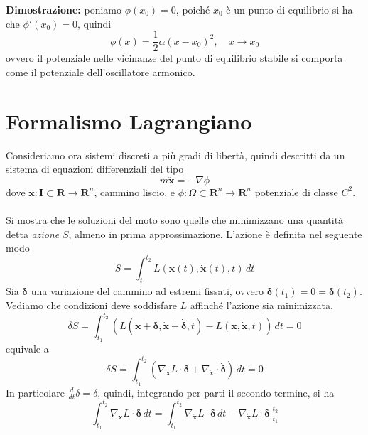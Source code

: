 \documentclass{article}
\begin{document}
\textbf{Dimostrazione:} poniamo $\phi(x_0) = 0$, poiché $x_0$ è un punto di equilibrio si ha che $\phi'(x_0) = 0$, quindi
\begin{equation}
    \phi(x) = \frac{1}{2}\alpha(x - x_0)^2, \quad x \longrightarrow x_0 \tag{2.5}
\end{equation}
ovvero il potenziale nelle vicinanze del punto di equilibrio stabile si comporta come il potenziale dell'oscillatore armonico.

\newpage
\section{Formalismo Lagrangiano}
Consideriamo ora sistemi discreti a più gradi di libertà, quindi descritti da un sistema di equazioni differenziali del tipo
\begin{equation}
    m\ddot{\mathbf{x}} = - \nabla \phi \tag{3.1}
\end{equation}
dove $\mathbf{x} : \mathbf{I} \subset \mathbf{R} \longrightarrow \mathbf{R}^n$, cammino liscio, e $\phi : \Omega \subset \mathbf{R}^n \longrightarrow \mathbf{R}^n$ potenziale di classe $C^2$. \\ \\
Si mostra che le soluzioni del moto sono quelle che minimizzano una quantità detta \textit{azione} $S$, almeno in prima approssimazione. L'azione è definita nel seguente modo
\begin{equation}
    S = \int_{t_1}^{t_2} L(\mathbf{x}(t), \dot{\mathbf{x}}(t), t) \, dt \tag{3.2}
\end{equation}
Sia $\boldsymbol{\delta}$ una variazione del cammino ad estremi fissati, ovvero $\boldsymbol{\delta}(t_1) = 0 = \boldsymbol{\delta}(t_2)$. Vediamo che condizioni deve soddisfare $L$ affinché l'azione sia minimizzata.
\begin{equation}
    \delta S = \int_{t_1}^{t_2} \left( L(\mathbf{x} + \boldsymbol{\delta}, \dot{\mathbf{x}} + \dot{\boldsymbol{\delta}}, t) - L(\mathbf{x}, \dot{\mathbf{x}}, t) \right) \, dt = 0 \tag{3.3}
\end{equation}
equivale a
\begin{equation}
    \delta S = \int_{t_1}^{t_2} \left(\nabla_{\mathbf{x}}L \cdot \boldsymbol{\delta} + \nabla_{\dot{\mathbf{x}}} \cdot \dot{\boldsymbol{\delta}}\right) \, dt = 0 \tag{3.3}
\end{equation}
In particolare $\frac{d}{dt}\delta = \dot{\delta}$, quindi, integrando per parti il secondo termine, si ha
\begin{equation}
    \int_{t_1}^{t_2} \nabla_{\mathbf{x}}L \cdot \boldsymbol{\delta} \, dt = \int_{t_1}^{t_2} \nabla_{\dot{\mathbf{x}}}L \cdot \boldsymbol{\delta} \, dt - \nabla_{\dot{\mathbf{x}}}L \cdot \boldsymbol{\delta}|_{t_1}^{t_2} \tag{3.4}
\end{equation}
\end{document}
